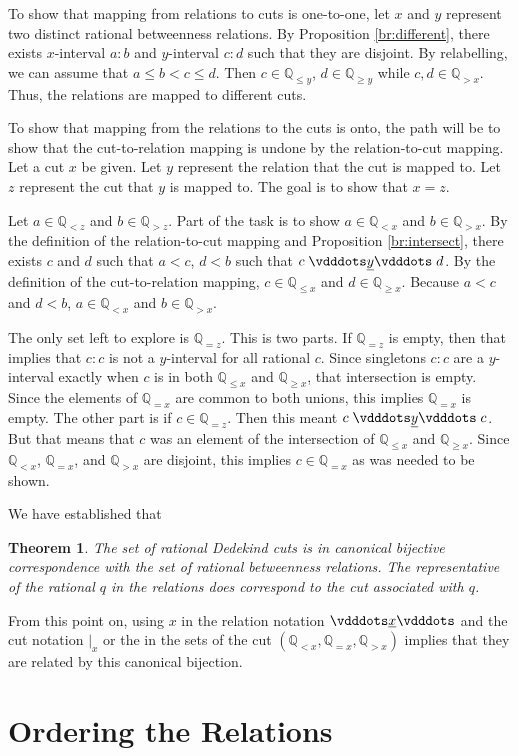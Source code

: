 \documentclass[12pt]{article}
\newtheorem{theorem}{Theorem}[section]
\newcommand{\qcut}[2][x]{\ensuremath{\mathbb{Q}_{#2 #1}}}
\newcommand{\qlt}[1][x]{\qcut[#1]{<}}
\newcommand{\qeq}[1][x]{\qcut[#1]{=}}
\newcommand{\qgt}[1][x]{\qcut[#1]{>}}
\newcommand{\qgeq}[1][x]{\qcut[#1]{\geq}}
\newcommand{\qleq}[1][x]{\qcut[#1]{\leq}}
\newcommand{\cut}[1][x]{{\vert}_{#1} }
\newcommand{\yrel}{\xrel[y]}
\begin{document}
To show that mapping from relations to cuts is one-to-one, let $x$ and $y$ represent two distinct rational betweenness relations. By Proposition \ref{br:different}, there exists $x$-interval $a:b$ and $y$-interval $c:d$ such that they are disjoint. By relabelling, we can assume that $a \leq b < c \leq d$. Then $c \in \qleq[y]$, $d \in \qgeq[y]$ while $c, d \in \qgt[x]$. Thus, the relations are mapped to different cuts. 

To show that mapping from the relations to the cuts is onto, the path will be to show that the cut-to-relation mapping is undone by the relation-to-cut mapping. Let a cut $x$ be given. Let $y$ represent the relation that the cut is mapped to. Let $z$ represent the cut that $y$ is mapped to. The goal is to show that $x =z$.  

Let $a \in \qlt[z]$ and $b \in \qgt[z]$. Part of the task is to show $a \in \qlt$ and $b \in \qgt$. By the definition of the relation-to-cut mapping and Proposition \ref{br:intersect}, there exists $c$ and $d$ such that $a < c$, $d < b$ such that $c \yrel d$. By the definition of the cut-to-relation mapping, $c \in \qleq$ and $d \in \qgeq$. Because $a < c$ and $ d < b$, $a \in \qlt$ and $b \in \qgt$. 

The only set left to explore is $\qeq[z]$. This is two parts. If $\qeq[z]$ is empty, then that implies that $c:c$ is not a $y$-interval for all rational $c$. Since singletons $c:c$ are a $y$-interval exactly when $c$ is in both $\qleq$ and $\qgeq$, that intersection is empty. Since the elements of $\qeq$ are common to both unions, this implies $\qeq$ is empty. The other part is if $c \in \qeq[z]$. Then this meant $c \xrel[y] c$. But that means that $c$ was an element of the intersection of $\qleq$ and $\qgeq$. Since $\qlt$, $\qeq$, and $\qgt$ are disjoint, this implies $c \in \qeq$ as was needed to be shown. 


We have established that
\begin{theorem}
    The set of rational Dedekind cuts is in canonical bijective correspondence with the set of rational betweenness relations. The representative of the rational $q$ in the relations does correspond to the cut associated with $q$.
\end{theorem}

From this point on, using $x$ in the relation notation $\xrel$ and the cut notation $\cut$ or the in the sets of the cut $(\qlt, \qeq, \qgt)$ implies that they are related by this canonical bijection. 

\section{Ordering the Relations}
\end{document}
